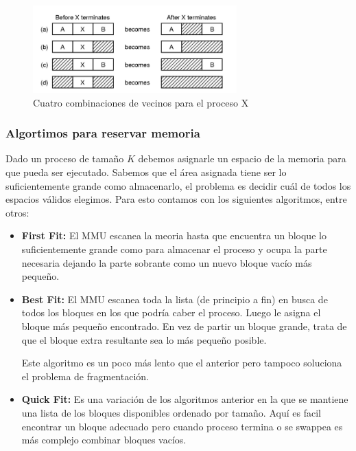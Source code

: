 \begin{figure}[h]
	\centering
	\includegraphics[width=0.7\textwidth]{imagenes/terminacion-proc-memoria}
	\caption{Cuatro combinaciones de vecinos para el proceso X}
	\label{fig:terminacion-proc-memoria}
\end{figure}

\subsubsection{Algortimos para reservar memoria}
Dado un proceso de tamaño $K$ debemos asignarle un espacio de la memoria para que pueda ser ejecutado. Sabemos que el área asignada tiene ser lo suficientemente grande como almacenarlo, el problema es decidir cuál de todos los espacios válidos elegimos. Para esto contamos con los siguientes algoritmos, entre otros:

\begin{itemize}
	\item \textbf{First Fit:} El MMU escanea la meoria hasta que encuentra un bloque lo suficientemente grande como para almacenar el proceso y ocupa la parte necesaria dejando la parte sobrante como un nuevo bloque vacío más pequeño.
	\item \textbf{Best Fit:} El MMU escanea toda la lista (de principio a fin) en busca de todos los bloques en los que podría caber el proceso. Luego le asigna el bloque más pequeño encontrado. En vez de partir un bloque grande, trata de que el bloque extra resultante sea lo más pequeño posible.
	
	Este algoritmo es un poco más lento que el anterior pero tampoco soluciona el problema de fragmentación.
	
	\item\textbf{Quick Fit:} Es una variación de los algoritmos anterior en la que se mantiene una lista de los bloques disponibles ordenado por tamaño. Aquí es facil encontrar un bloque adecuado pero cuando proceso termina o se swappea es más complejo combinar bloques vacíos.
\end{itemize}

\printbibliography[keyword=swapping,title=Bibliografía]

